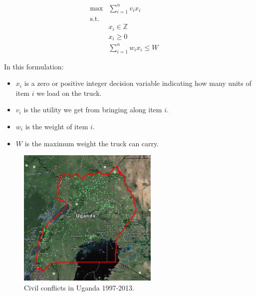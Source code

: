 \documentclass{article} %
\begin{document}
\begin{align*}
\max &\sum_{i=1}^n v_i x_i &&  \\
\mathrm{s.t.} & \\
    & x_i \in \mathbb{Z} \\
    & x_i \geq 0 \\
	& \sum_{i=1}^n w_ix_i \leq W
\end{align*}

In this formulation:

\begin{itemize}
  \item $x_{i}$ is a zero or positive integer decision variable indicating how many units of item $i$
        we load on the truck.
  \item $v_i$ is the utility we get from bringing along item $i$.
  \item $w_i$ is the weight of item $i$.
  \item $W$ is the maximum weight the truck can carry.
\end{itemize}


\begin{figure}
  \centering
  \includegraphics[width=0.6\textwidth]{figures/uganda.png}
  \caption{Civil conflicts in Uganda 1997-2013.}
  \label{fig:map}
\end{figure}




\end{document}
